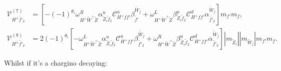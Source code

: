 \documentclass[final,3p,times,pdflatex]{elsarticle}
\begin{document}
\begin{align}
\mathcal{V}_{H^{\pm} \tilde{f'}_2}^{(7)} &= [-(-1)^{\theta_i}\omega_{H^+ \tilde{W}^+ \tilde{Z}}^R \alpha_{\tilde{Z}_i \tilde{f}_2}^{u} \mathcal{C}_{H^+ f f'}^u \beta_{\tilde{f'}}^{\tilde{W}_j} + \omega_{H^+ \tilde{W}^+ \tilde{Z}}^L \beta_{\tilde{Z}_i \tilde{f}_2}^{u} \mathcal{C}_{H^+ f f'}^d \alpha_{\tilde{f'}_2}^{\tilde{W}_j}]m_{f'}m_{f}, \\
\mathcal{V}_{H^{\pm} \tilde{f'}_2}^{(8)} &= 2(-1)^{\theta_i}[-\omega_{H^+ \tilde{W}^+ \tilde{Z}}^L \alpha_{\tilde{Z}_i \tilde{f}_2}^{u} \mathcal{C}_{H^+ f f'}^u \beta_{\tilde{f'}_2}^{\tilde{W}_j} + \omega_{H^+ \tilde{W}^+ \tilde{Z}}^R \beta_{\tilde{Z}_i \tilde{f}_2}^{u} \mathcal{C}_{H^+ f f'}^d \alpha_{\tilde{f'}_2}^{\tilde{W}_j}]|m_{\tilde{Z}_i}||m_{\tilde{W}_j}|m_{f'}m_{f}.
\end{align}


Whilst if it's a chargino decaying:
\end{document}
